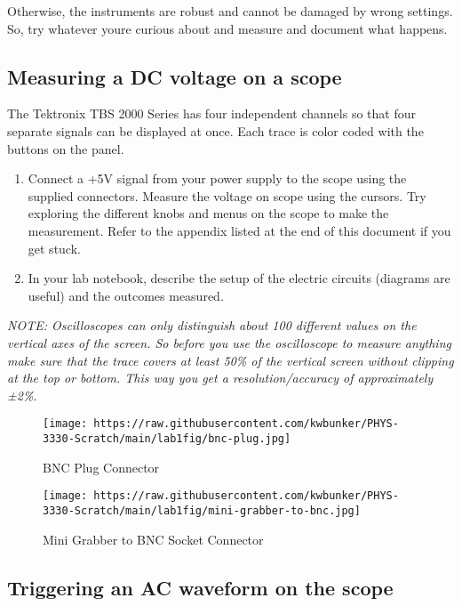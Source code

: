 \documentclass[
]{article}
\begin{document}
Otherwise, the instruments are robust and cannot be damaged by wrong
settings. So, try whatever youre curious about and measure and document
what happens.

\hypertarget{measuring-a-dc-voltage-on-a-scope}{%
\subsection{Measuring a DC voltage on a
scope}\label{measuring-a-dc-voltage-on-a-scope}}

The Tektronix TBS 2000 Series has four independent channels so that four
separate signals can be displayed at once. Each trace is color coded
with the buttons on the panel.

\begin{enumerate}
\def\labelenumi{\arabic{enumi}.}
\item
  Connect a +5V signal from your power supply to the scope using the
  supplied connectors. Measure the voltage on scope using the cursors.
  Try exploring the different knobs and menus on the scope to make the
  measurement. Refer to the appendix listed at the end of this document
  if you get stuck.
\item
  In your lab notebook, describe the setup of the electric circuits
  (diagrams are useful) and the outcomes measured.
\end{enumerate}

\emph{NOTE: Oscilloscopes can only distinguish about 100 different
values on the vertical axes of the screen. So before you use the
oscilloscope to measure anything make sure that the trace covers at
least 50\% of the vertical screen without clipping at the top or bottom.
This way you get a resolution/accuracy of approximately ±2\%.}

\begin{figure}
\hypertarget{fig:bnc}{%
\centering
\texttt{[image: https://raw.githubusercontent.com/kwbunker/PHYS-3330-Scratch/main/lab1fig/bnc-plug.jpg]}
\caption{BNC Plug Connector}\label{fig:bnc}
}
\end{figure}

\begin{figure}
\hypertarget{fig:grabber}{%
\centering
\texttt{[image: https://raw.githubusercontent.com/kwbunker/PHYS-3330-Scratch/main/lab1fig/mini-grabber-to-bnc.jpg]}
\caption{Mini Grabber to BNC Socket Connector}\label{fig:grabber}
}
\end{figure}

\hypertarget{triggering-an-ac-waveform-on-the-scope}{%
\subsection{Triggering an AC waveform on the
scope}\label{triggering-an-ac-waveform-on-the-scope}}
\end{document}
